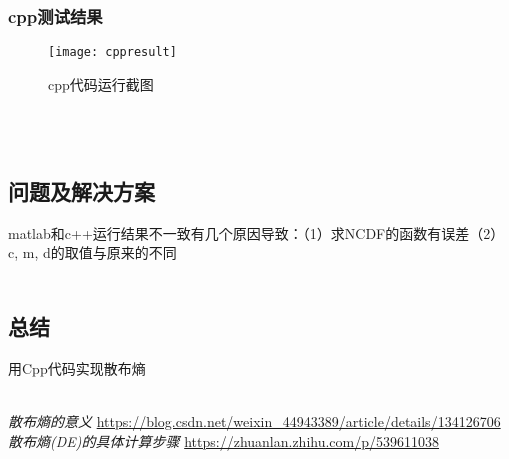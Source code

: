 \documentclass[cs4size,a4paper]{ctexart}
\begin{document}
\subsubsection{cpp测试结果}
\begin{figure}[H]
	\small
	\centering
	\texttt{[image: cppresult]}
	\caption{cpp代码运行截图}
\end{figure}


~\\
~\\
\subsection{问题及解决方案}
matlab和c++运行结果不一致有几个原因导致：（1）求NCDF的函数有误差（2）c, m, d的取值与原来的不同
~\\
~\\

\subsection{总结}
用Cpp代码实现散布熵
~\\
~\\


%


\begin{thebibliography}{99}
	{\em \color{red}散布熵的意义} \url{https://blog.csdn.net/weixin_44943389/article/details/134126706}
	{\em \color{red}散布熵(DE)的具体计算步骤} \url{https://zhuanlan.zhihu.com/p/539611038}
\end{thebibliography}
\end{document}
